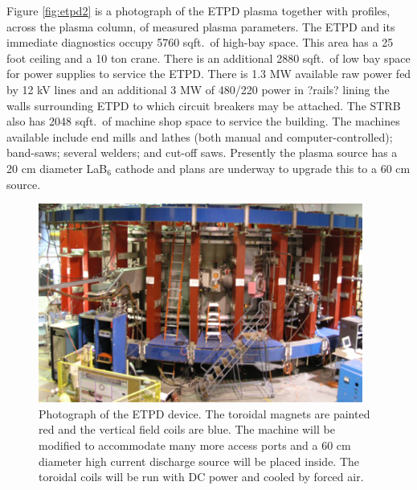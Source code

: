 \documentclass[11pt]{article}
\begin{document}
Figure \ref{fig:etpd2} is a photograph of the ETPD plasma together with profiles, across the plasma column, of measured plasma parameters.  The ETPD and its immediate diagnostics occupy 5760 sqft.\ of high-bay space.  This area has a 25 foot ceiling and a 10 ton crane.  There is an additional 2880 sqft.\ of low bay space for power supplies to service the ETPD.  There is 1.3 MW available raw power fed by 12 kV lines and an additional 3 MW of 480/220 power in ?rails? lining the walls surrounding ETPD to which circuit breakers may be attached.  The STRB also has 2048 sqft.\ of machine shop space to service the building.  The machines available include end mills and lathes (both manual and computer-controlled); band-saws; several welders; and cut-off saws.  Presently the plasma source has a 20 cm diameter LaB$_{6}$ cathode and plans are underway to upgrade this to a 60 cm source.
\begin{figure}[h] %
   \centering
   \includegraphics[width=0.95\textwidth]{ETPD.jpg} 
   \caption{Photograph of the ETPD device.  The toroidal magnets are painted red and the vertical field coils are blue. The machine will be modified to accommodate many more access ports and a 60 cm diameter high current discharge source will be placed inside.  The toroidal coils will be run with DC power and cooled by forced air.}
   \label{fig:etpd}
\end{figure}
\end{document}
